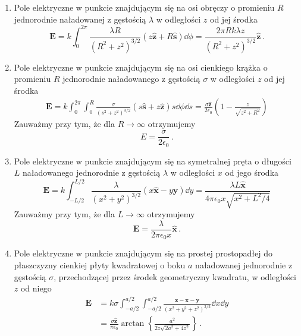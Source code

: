 \documentclass[../main.tex]{subfiles}
\begin{document}
\begin{enumerate}
    \item Pole elektryczne w punkcie znajdującym się na osi obręczy o promieniu \(R\) jednorodnie
    naładowanej z gęstością \(\lambda\) w odległości \(z\) od jej środka
    \begin{equation*}
        \mathbf{E}=k\int_0^{2\pi} \frac{\lambda R}{(R^2+z^2)^{3/2}}(z\mathbf{\hat{z}}+R\mathbf{\hat{s}})\dd{\phi}=\frac{2\pi Rk\lambda z}{(R^2+z^2)^{3/2}}\mathbf{\hat{z}}\,.
    \end{equation*}
    
    \item Pole elektryczne w punkcie znajdującym się na osi cienkiego krążka o promieniu \(R\)
    jednorodnie naładowanego z gęstością \(\sigma\) w odległości \(z\) od jej środka
    \begin{equation*}
    \begin{split}
        \mathbf{E}=k\int_0^{2\pi}\int_0^R\frac{\sigma }{(s^2+z^2)^{3/2}}(s\mathbf{\hat{s}}+z\mathbf{\hat{z}})s\dd{\phi}\dd{s}=\frac{\sigma\mathbf{\hat{z}}}{2\epsilon_0}\left(1-\frac{z}{\sqrt{z^2+R^2}}\right)
    \end{split}
    \end{equation*}
    Zauważmy przy tym, że dla \(R\to\infty\) otrzymujemy
    \begin{equation*}
        E=\frac{\sigma}{2\epsilon_0}\,.
    \end{equation*}
    \item Pole elektryczne w punkcie znajdującym się na symetralnej pręta o długości \(L\)
    naładowanego jednorodnie z gęstością \(\lambda\) w odległości \(x\) od jego środka
    \begin{equation*}
        \mathbf{E}=k\int_{-L/2}^{L/2}\frac{\lambda}{(x^2+y^2)^{3/2}}(x\mathbf{\hat{x}}-y\mathbf{\hat{y}})\dd{y}=\frac{\lambda L\mathbf{\hat{x}}}{4\pi\epsilon_0x\sqrt{x^2+L^2/4}}
    \end{equation*}
    Zauważmy przy tym, że dla \(L\to\infty\) otrzymujemy
    \begin{equation*}
        \mathbf{E}=\frac{\lambda}{2\pi\epsilon_0x}\mathbf{\hat{x}}\,.
    \end{equation*}
    
    \item Pole elektryczne w punkcie znajdującym się na prostej prostopadłej do płaszczyzny cienkiej
    płyty kwadratowej o boku \(a\) naładowanej jednorodnie z gęstością \(\sigma\), przechodzącej
    przez środek geometryczny kwadratu, w odległości \(z\) od niego
    \begin{equation*}
    \begin{split}
        \mathbf{E}&=k\sigma \int_{-a/2}^{a/2}\int_{-a/2}^{a/2}\frac{\mathbf{z}-\mathbf{x}-\mathbf{y}}{(x^2+y^2+z^2)^{3/2}}\dd{x}\dd{y}\\
        &=\frac{\sigma \mathbf{\hat{z}}}{\pi\epsilon_0}\arctan\left\{\frac{a^2}{2z\sqrt{2a^2+4z^2}}\right\}\,.
    \end{split}
    \end{equation*}
\end{enumerate}
\end{document}
